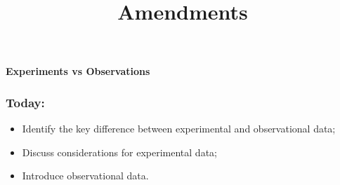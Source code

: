 \documentclass[aspectratio=169]{beamer}
\title{Amendments}
\date{}
\theoremstyle{principle}
\begin{document}


{
  \begin{frame}[plain]
  
\begin{mdframed}[tikzsetting={draw=white,fill=white,fill opacity=0.6,draw opacity=0.4,
               line width=0pt},backgroundcolor=none,leftmargin=20,
               rightmargin=20,innertopmargin=4pt]
\begin{center}
\Huge \textbf{Experiments vs Observations}
\end{center}
\end{mdframed}

  \end{frame}
}


%

\begin{frame}
\frametitle{Today:}

\begin{itemize}
\item Identify the key difference between experimental and observational data;
\bigskip
\bigskip

\item Discuss considerations for experimental data;
\bigskip
\bigskip

\item Introduce observational data.
\end{itemize}

\end{frame}
\end{document}
